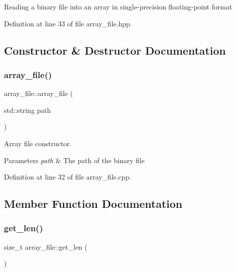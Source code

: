 Reading a binary file into an array in single-\/precision floating-\/point format 

Definition at line 33 of file array\+\_\+file.\+hpp.



\subsection{Constructor \& Destructor Documentation}
\mbox{\label{classarray__file_aed62743d4e948e84170eee630fb7fc99}} 
\subsubsection{\texorpdfstring{array\+\_\+file()}{array\_file()}}
{\footnotesize\ttfamily array\+\_\+file\+::array\+\_\+file (\begin{DoxyParamCaption}\item[{std\+::string}]{path }\end{DoxyParamCaption})}



Array file constructor. 


\begin{DoxyParams}{Parameters}
{\em path} & The path of the binary file \\
\hline
\end{DoxyParams}


Definition at line 32 of file array\+\_\+file.\+cpp.



\subsection{Member Function Documentation}
\mbox{\label{classarray__file_a3add9229dd47d68e0fa4a3e2e3c5e1e1}} 
\subsubsection{\texorpdfstring{get\+\_\+len()}{get\_len()}}
{\footnotesize\ttfamily size\+\_\+t array\+\_\+file\+::get\+\_\+len (\begin{DoxyParamCaption}{ }\end{DoxyParamCaption})}



